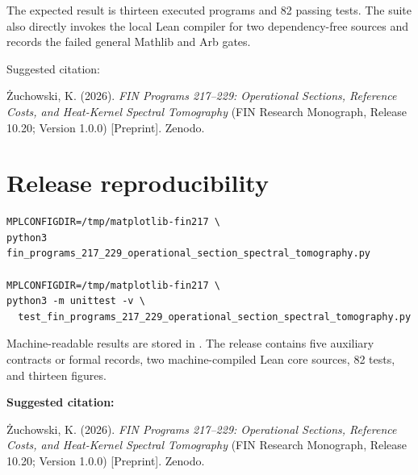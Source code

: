 \documentclass[11pt,a4paper,openany]{report}
\begin{document}
The expected result is thirteen executed programs and 82 passing tests. The suite also directly invokes the local Lean compiler for two dependency-free sources and records the failed general Mathlib and Arb gates.

Suggested citation:

\.Zuchowski, K. (2026). \emph{FIN Programs 217--229: Operational Sections, Reference Costs, and Heat-Kernel Spectral Tomography} (FIN Research Monograph, Release 10.20; Version 1.0.0) [Preprint]. Zenodo.


\clearpage
\chapter*{Release reproducibility}
\begin{Verbatim}[fontsize=\small]
MPLCONFIGDIR=/tmp/matplotlib-fin217 \
python3 fin_programs_217_229_operational_section_spectral_tomography.py

MPLCONFIGDIR=/tmp/matplotlib-fin217 \
python3 -m unittest -v \
  test_fin_programs_217_229_operational_section_spectral_tomography.py
\end{Verbatim}

Machine-readable results are stored in
.
The release contains five auxiliary contracts or formal records, two
machine-compiled Lean core sources, 82 tests, and thirteen figures.

\medskip
\noindent\textbf{Suggested citation:}

\.Zuchowski, K. (2026). \emph{FIN Programs 217--229: Operational Sections,
Reference Costs, and Heat-Kernel Spectral Tomography}
(FIN Research Monograph, Release 10.20; Version 1.0.0) [Preprint]. Zenodo.
\end{document}
